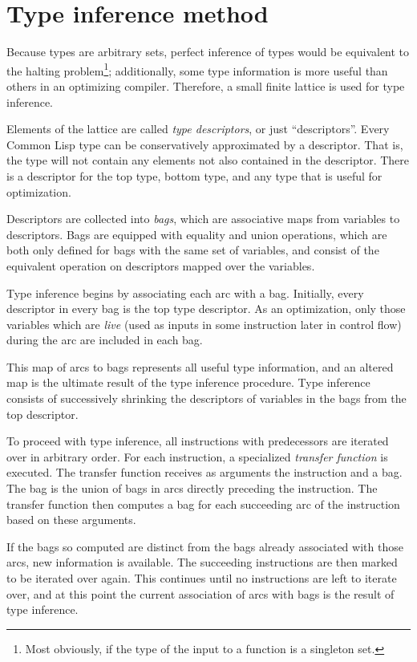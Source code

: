 \section{Type inference method}

Because \commonlisp{} types are arbitrary sets, perfect inference of
\commonlisp{} types would be equivalent to the halting
problem\footnote{Most obviously, if the type of the input to a
  function is a singleton set.}; additionally, some type information
is more useful than others in an optimizing compiler. Therefore, a
small finite lattice is used for type inference.

Elements of the lattice are called \textit{type descriptors}, or just
``descriptors''. Every Common Lisp type can be conservatively
approximated by a descriptor. That is, the type will not contain any
elements not also contained in the descriptor. There is a descriptor
for the top type, bottom type, and any type that is useful for
optimization.

Descriptors are collected into \textit{bags}, which are associative
maps from variables to descriptors. Bags are equipped with equality
and union operations, which are both only defined for bags with the
same set of variables, and consist of the equivalent operation on
descriptors mapped over the variables.

Type inference begins by associating each arc with a bag. Initially,
every descriptor in every bag is the top type descriptor. As an
optimization, only those variables which are \textit{live} (used as
inputs in some instruction later in control flow) during the arc are
included in each bag.

This map of arcs to bags represents all useful type information, and
an altered map is the ultimate result of the type inference
procedure. Type inference consists of successively shrinking the
descriptors of variables in the bags from the top descriptor.

To proceed with type inference, all instructions with predecessors are
iterated over in arbitrary order. For each instruction, a specialized
\textit{transfer function} is executed. The transfer function receives
as arguments the instruction and a bag. The bag is the union of bags
in arcs directly preceding the instruction. The transfer function then
computes a bag for each succeeding arc of the instruction based on
these arguments.

If the bags so computed are distinct from the bags already associated
with those arcs, new information is available. The succeeding
instructions are then marked to be iterated over again. This continues
until no instructions are left to iterate over, and at this point the
current association of arcs with bags is the result of type inference.

